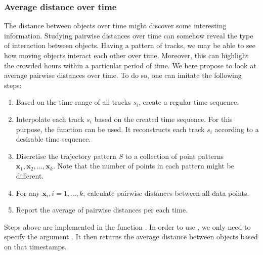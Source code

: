 \documentclass[article]{jss}
\begin{document}
\subsubsection{Average distance over time}
  The distance between objects over time might discover some interesting information. Studying pairwise distances over time can somehow reveal the type of interaction between objects. Having a pattern of tracks, we may be able to see how moving objects interact each other over time. Moreover, this can highlight the crowded hours within a particular period of time. We here propose to look at average pairwise distances over time. To do so, one can imitate the following steps:
  \begin{leftbar}
  \begin{enumerate}
  \item Based on the time range of all tracks $s_i$, create a regular time sequence.
  \item Interpolate each track $s_i$ based on the created time sequence. For this purpose, the function  can be used. It reconstructs each track $s_i$ according to a desirable time sequence.
  \item Discretise the trajectory pattern $S$ to a collection of point patterns $\mathbf{x}_1,\mathbf{x}_2, \ldots, \mathbf{x}_k$. Note that the number of points in each pattern might be different.
  \item For any $\mathbf{x}_i ,i=1,\ldots,k$, calculate pairwise distances between all data points.
  \item Report the average of pairwise distances per each time.
  \end{enumerate}
  \end{leftbar}
  Steps above are implemented in the function . In order to use , we only need to specify the argument . It then returns the average distance between objects based on that timestamps. 
\begin{Schunk}
\end{Schunk}
\end{document}
